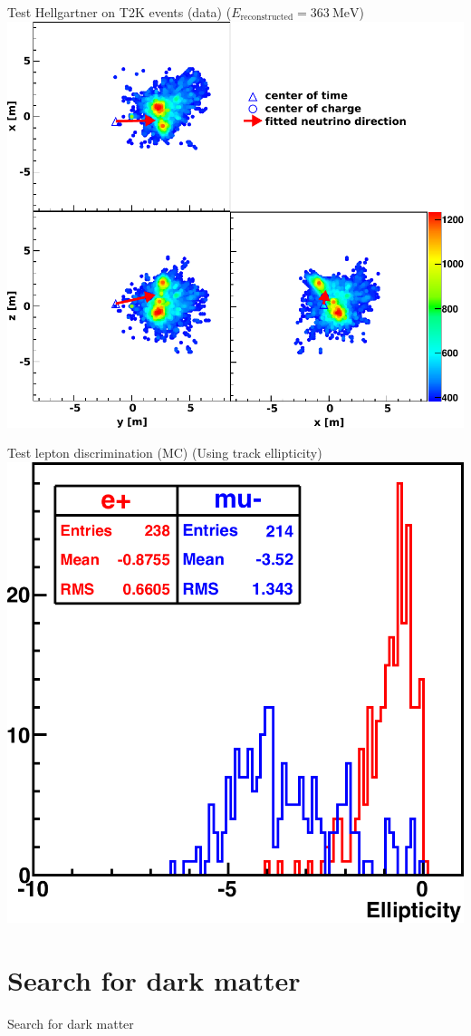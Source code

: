\documentclass[14pt]{beamer}
\begin{document}
\begin{frame}{Test Hellgartner on T2K events (data)}
	{($E_{\text{reconstructed}} = \SI{363}{\mega\electronvolt}$)}
	\centering
	\includegraphics[width=0.75\linewidth]{fom_map__run11339_evt39049330-cleaned.pdf}
\end{frame}


\begin{frame}{Test lepton discrimination (MC)}
	{(Using track ellipticity)}
	\centering
	\includegraphics[width=0.6\linewidth]{emu_mtq_recon_ellipticity-3Mcut.pdf}
\end{frame}

\section{Search for dark matter}
\begin{frame}
	\centering
	{\huge Search for dark matter}
\end{frame}
\end{document}

